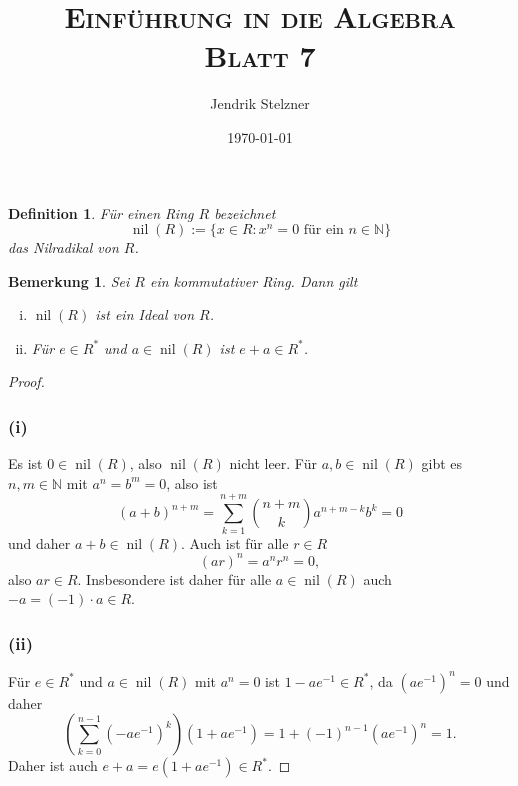 \documentclass[a4paper,10pt]{article}
\title{\textsc{Einführung in die Algebra \\ \Large Blatt 7}}
\author{Jendrik Stelzner}
\date{\today}
\newcounter{satze}
\newtheorem{bem}[satze]{Bemerkung}
\newtheorem*{defi}{Definition}
\theoremstyle{definition}
\newcommand{\N}{\mathbb{N}}
\newcommand{\nil}{\operatorname{nil}}
\begin{document}
\maketitle





\section{}





\section{}





\section{}

\begin{defi}
 Für einen Ring $R$ bezeichnet
 \[
  \nil(R) := \{x \in R : x^n = 0 \text{ für ein } n \in \N\}
 \]
 das Nilradikal von $R$.
\end{defi}

\begin{bem}\label{bem: nilradikal}
 Sei $R$ ein kommutativer Ring. Dann gilt
 \begin{enumerate}[(i)]
  \item $\nil(R)$ ist ein Ideal von $R$.
  \item Für $e \in R^*$ und $a \in \nil(R)$ ist $e+a \in R^*$.
 \end{enumerate}
\end{bem}

\begin{proof}
 \subsubsection*{(i)}
  Es ist $0 \in \nil(R)$, also $\nil(R)$ nicht leer. Für $a,b \in \nil(R)$ gibt es $n,m \in \N$ mit $a^n = b^m = 0$, also ist
  \[
   (a+b)^{n+m} = \sum_{k=1}^{n+m} \binom{n+m}{k} a^{n+m-k} b^k = 0
  \]
  und daher $a+b \in \nil(R)$. Auch ist für alle $r \in R$
  \[
   (ar)^n = a^n r^n = 0,
  \]
  also $ar \in R$. Insbesondere ist daher für alle $a \in \nil(R)$ auch $-a = (-1) \cdot a \in R$.
 \subsubsection*{(ii)}
  Für $e \in R^*$ und $a \in \nil(R)$ mit $a^n = 0$ ist $1-ae^{-1} \in R^*$, da $\left(ae^{-1}\right)^n = 0$ und daher
  \[
   \left(\sum_{k=0}^{n-1} \left(-ae^{-1}\right)^k\right) \left(1+ae^{-1}\right)
   = 1+ (-1)^{n-1} \left(ae^{-1}\right)^n
   = 1.
  \]
  Daher ist auch $e+a = e\left(1+ae^{-1}\right) \in R^*$.
\end{proof}
\end{document}
